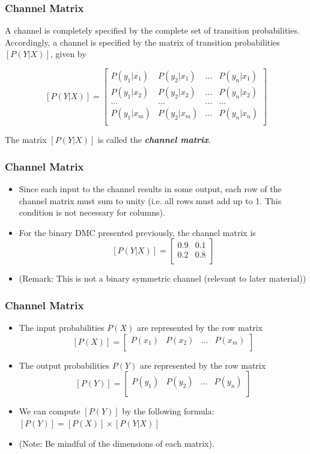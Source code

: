 \documentclass[a4]{beamer}
\begin{document}
\begin{frame}
\frametitle{Channel Matrix}

A channel is completely specified by the complete set of transition probabilities. Accordingly, a
channel is specified by the matrix of transition probabilities $[P(Y|X)]$, given by

\[  [P(Y|X)]  = \left[ \begin{array}{cccc}
P(y_1|x_1) & P(y_2|x_1) & \ldots & P(y_n|x_1) \\
P(y_1|x_2) & P(y_2|x_2) & \ldots & P(y_n|x_2) \\
\ldots & \ldots & \ldots & \ldots \\
P(y_1|x_m) & P(y_2|x_m) & \ldots & P(y_n|x_n) \\
\end{array} \right] \]


The matrix $[P(Y|X)]$ is called the \textbf{\emph{channel matrix}}.
\end{frame}

\begin{frame}
\frametitle{Channel Matrix}
\begin{itemize}
\item Since each input to the channel results in some
output, each row of the channel matrix must sum to unity (i.e. all rows must add up to 1. This condition is not necessary for columns).
\item For the binary DMC presented previously, the channel matrix is
\[  [P(Y|X)]  = \left[ \begin{array}{cc}
0.9 & 0.1  \\
0.2 & 0.8 \\
\end{array} \right] \]
\item (Remark: This is not a binary symmetric channel (relevant to later material))
\end{itemize}
\end{frame}


\begin{frame}
\frametitle{Channel Matrix}
\begin{itemize}
\item The input probabilities $P(X)$ are represented by the row matrix
\[  [P(X)]  = \left[ \begin{array}{cccc}
P(x_1) & P(x_2) & \ldots & P(x_m) \\
\end{array} \right] \]
\item The output probabilities $P(Y)$ are represented by the row matrix
\[  [P(Y)]  = \left[ \begin{array}{cccc}
P(y_1) & P(y_2) & \ldots & P(y_n) \\
\end{array} \right] \]
\item We can compute $[P(Y)] $ by the following formula: $[P(Y)]  = [P(X)]\times [P(Y|X)]$
\item (Note: Be mindful of the dimensions of each matrix).
\end{itemize}
\end{frame}
\end{document}
